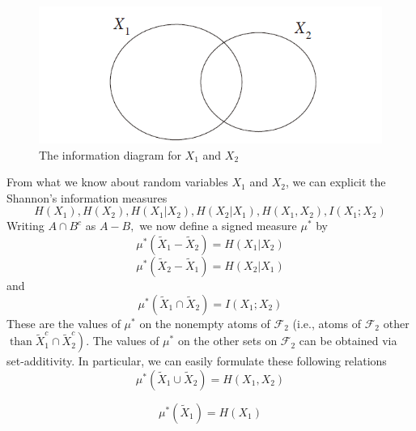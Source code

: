 \begin{figure}[ht]
 
\centering
\includegraphics[scale=0.4]{tex/Im2.png}
\caption{The information diagram for ${X}_{1}$ and
${X}_{2}$}
\label{im2}
 
\end{figure}

From what we know about random variables $X_{1}$ and $X_{2}$, we can explicit the Shannon's information measures
\[
H\left(X_{1}\right), H\left(X_{2}\right), H\left(X_{1} | X_{2}\right), H\left(X_{2} | X_{1}\right), H\left(X_{1}, X_{2}\right), I\left(X_{1} ; X_{2}\right)
\]
Writing $A \cap B^{c}$ as $A-B,$ we now define a signed measure $\mu^{*}$ by
\begin{equation}
    \mu^{*}\left(\tilde{X}_{1}-\tilde{X}_{2}\right)=H\left(X_{1} | X_{2}\right)
\end{equation}
\begin{equation}
\mu^{*}\left(\tilde{X}_{2}-\tilde{X}_{1}\right)=H\left(X_{2} | X_{1}\right)
\end{equation}
and
\begin{equation}
\mu^{*}\left(\tilde{X}_{1} \cap \tilde{X}_{2}\right)=I\left(X_{1} ; X_{2}\right)
\end{equation}
These are the values of $\mu^{*}$ on the nonempty atoms of $\mathcal{F}_{2}$ (i.e., atoms of $\mathcal{F}_{2}$ other $\left.\operatorname{than} \tilde{X}_{1}^{c} \cap \tilde{X}_{2}^{c}\right) .$ The values of $\mu^{*}$ on the other sets on $\mathcal{F}_{2}$ can be obtained via set-additivity. In particular, we can easily formulate these following relations
\begin{equation}
\mu^{*}\left(\tilde{X}_{1} \cup \tilde{X}_{2}\right) =H\left(X_{1}, X_{2}\right)
\end{equation}

\begin{equation}
\mu^{*}\left(\tilde{X}_{1}\right) =H\left(X_{1}\right)
\end{equation}

